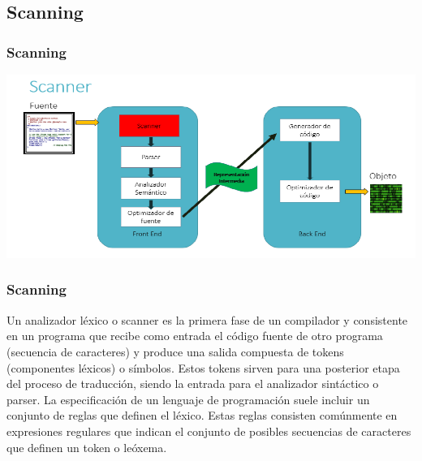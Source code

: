 \documentclass{beamer}
\begin{document}
\subsection{Scanning}\begin{frame} 
\frametitle{Scanning} 
 
\includegraphics[width=\textwidth]{scan}\end{frame} 
\begin{frame}[allowframebreaks] 
\frametitle{Scanning} 
 
Un analizador léxico o scanner es la primera fase de un compilador y consistente en un programa que recibe como entrada el código fuente de otro programa (secuencia de caracteres) y produce una salida compuesta de tokens (componentes léxicos) o símbolos. Estos tokens sirven para una posterior etapa del proceso de traducción, siendo la entrada para el analizador sintáctico o parser. La especificación de un lenguaje de programación suele incluir un conjunto de reglas que definen el léxico. Estas reglas consisten comúnmente en expresiones regulares que indican el conjunto de posibles secuencias de caracteres que definen un token o leóxema.\end{frame} 
\end{document}
